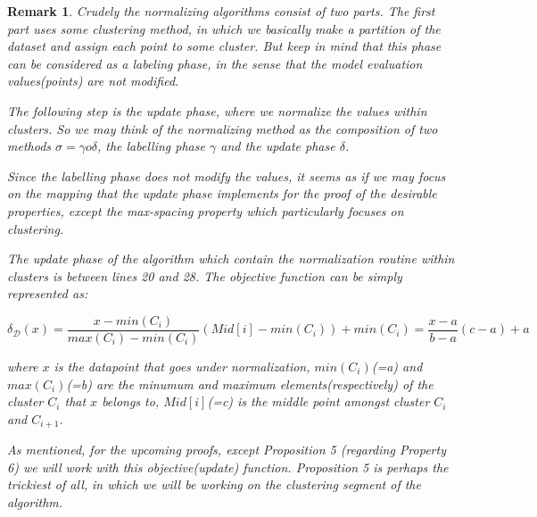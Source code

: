 \documentclass{article}
\newtheorem{remark}{Remark}
\newcommand{\dataset}{\mathcal{D}}   %
\begin{document}
\begin{comment}
\emph{special treatment of the first line}\;
\For{$i\leftarrow 2$ \KwTo $l$}{
\emph{special treatment of the first element of line $i$}\;
\For{$j\leftarrow 2$ \KwTo $w$}{\nllabel{forins}
\Left$\leftarrow$ \FindCompress{$Im[i,j-1]$}\;
\Up$\leftarrow$ \FindCompress{$Im[i-1,]$}\;
\This$\leftarrow$ \FindCompress{$Im[i,j]$}\;
\If{\Left compatible with \This}{
\lIf{\Left $<$ \This}{\Union{\Left,\This}}\;
\lElse{\Union{\This,\Left}}
}
\If{\Up compatible with \This}{
\lIf{\Up $<$ \This}{\Union{\Up,\This}}\;
\lElse{\Union{\This,\Up}}
}
}
\lForEach{element $e$ of the line $i$}{
\FindCompress{p}
}
}

\end{comment}

\begin{remark}

Crudely the normalizing algorithms consist of two parts. The first part uses some clustering method, in which we basically make a partition of the dataset and assign each point to some cluster. But keep in mind that this phase can be considered as a labeling phase, in the sense that the model evaluation values(points) are not modified.

The following step is the update phase, where we normalize the values within clusters. So we may think of the normalizing method as the composition of two methods $\sigma = \gamma o \delta$, the labelling phase $\gamma$ and the update phase $\delta$.

Since the labelling phase does not modify the values, it seems as if we may focus on the mapping that the update phase implements for the proof of the desirable properties, except the max-spacing property which particularly focuses on clustering.

The update phase of the algorithm which contain the normalization routine within clusters is between lines 20 and 28. The objective function can be simply represented as:

\begin{center}
$\delta_{\dataset}(x) = \dfrac{x-min(C_i)}{max(C_i)-min(C_i)} (Mid[i]-min(C_i)) +min(C_i) = \dfrac{x-a}{b-a} (c-a) + a$
\end{center}

where $x$ is the datapoint that goes under normalization, $min(C_i)$\emph{(=a)} and $max(C_i)$\emph{(=b)} are the minumum and maximum elements(respectively) of the cluster $C_i$ that $x$ belongs to, $Mid[i]$\emph{(=c)} is the middle point amongst cluster $C_i$ and $C_{i+1}$.

As mentioned, for the upcoming proofs, except Proposition 5 (regarding Property 6) we will work with this objective(update) function.  Proposition 5 is perhaps the trickiest of all, in which we will be working on the clustering segment of the algorithm.

\end{remark}
\end{document}
